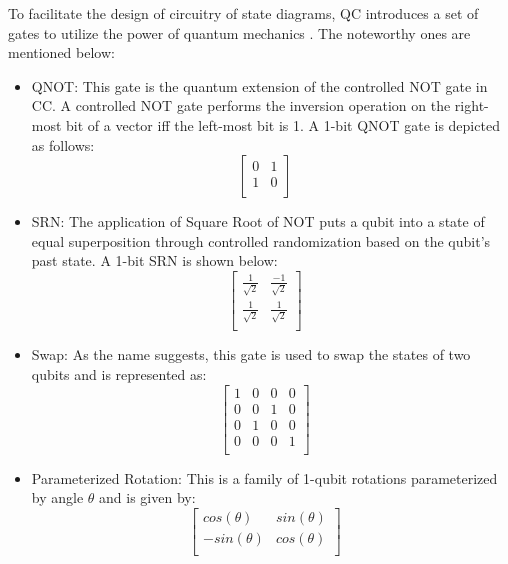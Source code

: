 \documentclass[conference]{IEEEtran}
\begin{document}
To facilitate the design of circuitry of state diagrams, QC introduces a set of gates to utilize the power of quantum mechanics \cite{qg}. The noteworthy ones are mentioned below:

\begin{itemize}
\item QNOT: This gate is the quantum extension of the controlled NOT gate in CC. A controlled NOT gate performs the inversion operation on the right-most bit of a vector iff the left-most bit is 1. A 1-bit QNOT gate is depicted as follows:
$$
\begin{bmatrix} 
0&1\\
1&0\\
\end{bmatrix}
\quad
$$
\item SRN: The application of Square Root of NOT puts a qubit into a state of equal superposition through controlled randomization based on the qubit's past state. A 1-bit SRN is shown below:
$$
\begin{bmatrix} 
\frac{1}{\sqrt{2}}&\frac{-1}{\sqrt{2}}\\
\frac{1}{\sqrt{2}}&\frac{1}{\sqrt{2}}\\
\end{bmatrix}
\quad
$$
\item Swap: As the name suggests, this gate is used to swap the states of two qubits and is represented as:
$$
\begin{bmatrix} 
{1}&{0}&{0}&{0}\\
{0}&{0}&{1}&{0}\\
{0}&{1}&{0}&{0}\\
{0}&{0}&{0}&{1}\\
\end{bmatrix}
\quad
$$
\item Parameterized Rotation: This is a family of 1-qubit rotations parameterized by angle $\theta$ and is given by:
$$
\begin{bmatrix} 
cos(\theta)&sin(\theta)\\
-sin(\theta)&cos(\theta)\\
\end{bmatrix}
\quad
$$
\end{itemize}
\end{document}

